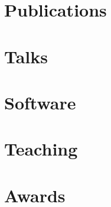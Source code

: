\documentclass[margin,line]{res}
\begin{document}
\begin{resume}
\section{\sc Publications}



\section{\sc Talks}



\section{\sc Software}



\section{\sc Teaching}



\section{\sc Awards}



\end{resume}
\end{document}
